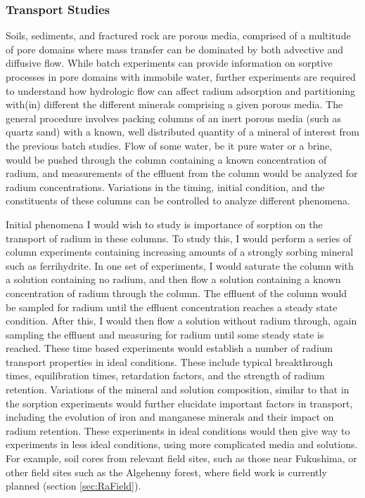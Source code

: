 \documentclass[twoside,12pt,titlepage]{article}
\begin{document}
\subsubsection{Transport Studies}
\label{sec:RaTransport}
Soils, sediments, and fractured rock are porous media, comprised of a multitude of pore domains where mass transfer can be dominated by both advective and diffusive flow. While batch experiments can provide information on sorptive processes in pore domains with immobile water, further experiments are required to understand how hydrologic flow can affect radium adsorption and partitioning with(in) different the different minerals comprising a given porous media. The general procedure involves packing columns of an inert porous media (such as quartz sand) with a known, well distributed quantity of a mineral of interest from the previous batch studies. Flow of some water, be it pure water or a brine, would be pushed through the column containing a known concentration of radium, and measurements of the effluent from the column would be analyzed for radium concentrations. Variations in the timing, initial condition, and the constituents of these columns can be controlled to analyze different phenomena.
\par Initial phenomena I would wish to study is importance of sorption on the transport of radium in these columns. To study this, I would perform a series of column experiments containing increasing amounts of a strongly sorbing mineral such as ferrihydrite. In one set of experiments, I would saturate the column with a solution containing no radium, and then flow a solution containing a known concentration of radium through the column. The effluent of the column would be sampled for radium until the effluent concentration reaches a steady state condition. After this, I would then flow a solution without radium through, again sampling the effluent and measuring for radium until some steady state is reached. These time based experiments would establish a number of radium transport properties in ideal conditions. These include typical breakthrough times, equilibration times, retardation factors, and the strength of radium retention. Variations of the mineral and solution composition, similar to that in the sorption experiments would further elucidate important factors in transport, including the evolution of iron and manganese minerals and their impact on radium retention. These experiments in ideal conditions would then give way to experiments in less ideal conditions, using more complicated media and solutions. For example, soil cores from relevant field sites, such as those near Fukushima, or other field sites such as the Algehenny forest, where field work is currently planned (section \ref{sec:RaField}).
\end{document}
